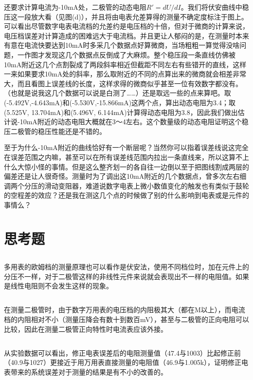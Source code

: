 \documentclass[UTF8]{ctexart}
\begin{document}
还要求计算电流为-10mA处，二极管的动态电阻$R'=dU/dI$。我们将伏安曲线中稳压这一段放大看（见图(d)），并且将由电表允差算得的测量不确定度标注于图上。可以看出尽管数字电表电流档的允差约是电压档的十倍，但对于微商的计算来说，电压档误差对计算造成的困难远大于电流档。并且更让人郁闷的是，在测量时本来有意在电流快要达到10mA时多采几个数据点好算微商，当场粗粗一算觉得没啥问题，一作图才发现这几个数据点反倒成了大麻烦。整个稳压段一条直线仿佛被10mA附近这几个点割裂成了两段斜率相近但截距不同左右有些错开的直线，这样一来如果要求10mA处的斜率，那么取附近的不同的点算出来的微商就会相差非常大，而且看图上误差线的长度，这样求得的微商似乎甚至一位有效数字都没有。（也就是说我这几个数据可以说是白测了……）还是取远一些的点来算吧。取(-5.492V,-4.643mA)和(-5.530V,-15.866mA)这两个点，算出动态电阻为3.4\ohm ；取(5.525V, 13.704mA)和(5.496V, 6.144mA)计算得动态电阻为3.8\ohm ，因此我们做出估计说-10mA附近的动态电阻大概就在3～4\ohm 左右。这个数量级的动态电阻证明这个稳压二极管的稳压性能还是不错的。

至于为什么-10mA附近的曲线恰好有一个断层呢？当然你可以指着误差线说这完全在误差范围之内嘛，甚至可以在所有误差线范围内拉出一条直线来，所以这算不上什么大惊小怪的事情。但是这么整齐划一的各自往一边倒以至于把图线割成两层的偏差还是让人很奇怪。测量时为了调出这10mA附近的几个数据点，曾多次左右细调两个分压的滑动变阻器，难道说数字电表上微小数值变化的触发也有类似于鼓轮的空程差的效应？还是我在测这几个点的时候做了别的什么影响到电表或是元件的事情么？

\section{思考题}
\subsection{}
多用表的欧姆档的测量原理也可以看作是伏安法，使用不同档位时，加在元件上的分压不一样，对于二极管这样的非线性元件来说就会表现出不一样的电阻值。如果是线性电阻则不会发生这样的现象。

\subsection{}
在测量二极管时，由于数字万用表的电压档的内阻极其大（都在M\ohm  以上），而电流档的内阻相对不小（测量压降会有数十到数百mV），甚至与二极管的正向电阻可以比较，因此在测量二极管正向特性时电流表应该外接。

\subsection{}
从实验数据可以看出，修正电表误差后的电阻测量值（47.4\ohm 与1003\ohm ）比起修正前（40.9\ohm 与1027\ohm ）更接近于用万用表直接测量的电阻值（46.9\ohm 与1.005k\ohm ），证明修正电表带来的系统误差对于测量的结果是有不小的改善的。
\end{document}
